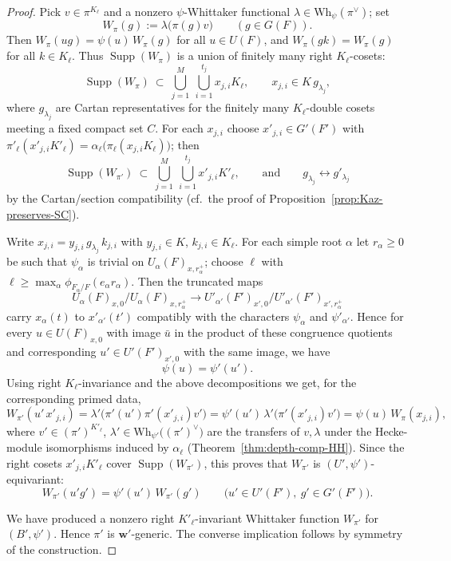 \documentclass[american]{article}
\numberwithin{equation}{section}
\numberwithin{figure}{section}
\theoremstyle{plain}
\theoremstyle{definition}
\theoremstyle{remark}
\DeclareMathOperator{\Supp}{Supp}
\begin{document}
\begin{proof}
\smallskip

Pick \(v\in\pi^{K_\ell}\) and a nonzero \(\psi\)-Whittaker functional
\(\lambda\in\mathrm{Wh}_\psi(\pi^\vee)\); set
\[
W_\pi(g):=\lambda\bigl(\pi(g)v\bigr)\qquad(g\in G(F)).
\]
Then \(W_\pi(ug)=\psi(u)\,W_\pi(g)\) for all \(u\in U(F)\), and
\(W_\pi(gk)=W_\pi(g)\) for all \(k\in K_\ell\).
Thus \(\Supp(W_\pi)\) is a union of finitely many right \(K_\ell\)-cosets:
\[
\Supp(W_\pi)\ \subset\ \bigcup_{j=1}^M \ \bigcup_{i=1}^{t_j} x_{j,i}K_\ell,
\qquad x_{j,i}\in K\,g_{\lambda_j},
\]
where \(g_{\lambda_j}\) are Cartan representatives for the finitely many
\(K_\ell\)-double cosets meeting a fixed compact set \(C\).
For each \(x_{j,i}\) choose \(x'_{j,i}\in G'(F')\) with
\(\pi'_\ell(x'_{j,i}K'_\ell)=\alpha_\ell\bigl(\pi_\ell(x_{j,i}K_\ell)\bigr)\);
then
\[
\Supp(W_{\pi'})\ \subset\ \bigcup_{j=1}^M \ \bigcup_{i=1}^{t_j} x'_{j,i}K'_\ell,
\qquad\text{and}\qquad g_{\lambda_j}\longleftrightarrow g'_{\lambda_j}
\]
by the Cartan/section compatibility (cf.\ the proof of
Proposition~\ref{prop:Kaz-preserves-SC}). 

\smallskip
Write \(x_{j,i}=y_{j,i}\,g_{\lambda_j}\,k_{j,i}\) with \(y_{j,i}\in K\),
\(k_{j,i}\in K_\ell\). For each simple root \(\alpha\) let \(r_\alpha\ge 0\) be
such that \(\psi_\alpha\) is trivial on \(U_\alpha(F)_{x,r_\alpha^+}\);
choose \(\ell\) with
\(\ell\ge \max_\alpha \phi_{F_\alpha/F}(e_\alpha r_\alpha)\).
Then the truncated maps
\[
U_\alpha(F)_{x,0}\big/U_\alpha(F)_{x,r_\alpha^+}
\longrightarrow
U'_{\alpha'}(F')_{x',0}\big/U'_{\alpha'}(F')_{x',r_\alpha^+}
\]
carry \(x_\alpha(t)\) to \(x'_{\alpha'}(t')\) compatibly with the
characters \(\psi_\alpha\) and \(\psi'_{\alpha'}\). Hence for every
\(u\in U(F)_{x,0}\) with image \(\bar u\) in the product of these congruence
quotients and corresponding \(u'\in U'(F')_{x',0}\) with the same image,
we have
\[
\psi(u)=\psi'(u').
\]
Using right \(K_\ell\)-invariance and the above decompositions we get, for the
corresponding primed data,
\[
W_{\pi'}(u'\,x'_{j,i})
= \lambda'\bigl(\pi'(u')\pi'(x'_{j,i})v'\bigr)
= \psi'(u')\,\lambda'\bigl(\pi'(x'_{j,i})v'\bigr)
= \psi(u)\,W_{\pi}(x_{j,i}),
\]
where \(v'\in(\pi')^{K'_\ell}\), \(\lambda'\in\mathrm{Wh}_{\psi'}\bigl((\pi')^\vee\bigr)\) are the
transfers of \(v,\lambda\) under the Hecke-module isomorphisms induced by
\(\alpha_\ell\) (Theorem~\ref{thm:depth-comp-HH}). Since the right cosets
\(x'_{j,i}K'_\ell\) cover \(\Supp(W_{\pi'})\), this proves that
\(W_{\pi'}\) is \((U',\psi')\)-equivariant:
\[
W_{\pi'}(u'g')=\psi'(u')\,W_{\pi'}(g')\qquad
\bigl(u'\in U'(F'),\ g'\in G'(F')\bigr).
\]

\smallskip
We have produced a nonzero right \(K'_\ell\)-invariant Whittaker function
\(W_{\pi'}\) for \((B',\psi')\). Hence \(\pi'\) is \(\mathbf w'\)-generic.
The converse implication follows by symmetry of the construction.
\end{proof}
\end{document}
